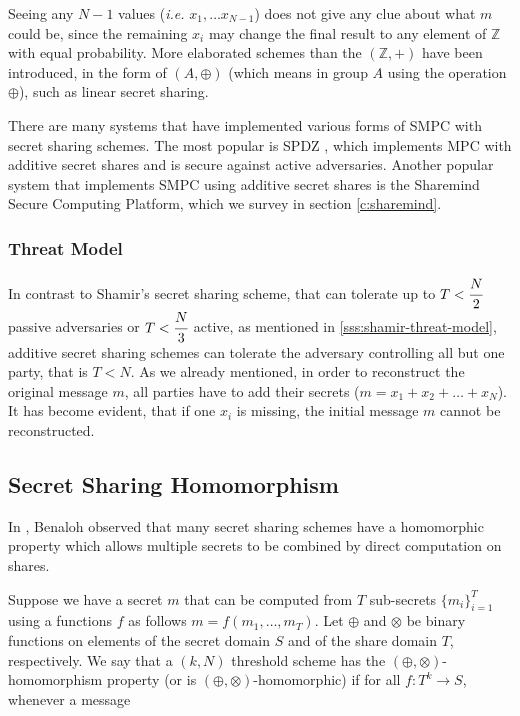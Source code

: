 Seeing any $N-1$ values (\textit{i.e.} $x_1, \dots x_{N-1}$) does not give any clue about what $m$ could be, since the remaining $x_i$ may change the final result to any element of $\mathbb{Z}$ with equal probability.
More elaborated schemes than the $(\mathbb{Z}, +)$ have been introduced, in the form of $(A, \oplus)$ (which means in group $A$ using the operation $\oplus$), such as linear secret sharing.

There are many systems that have implemented various forms of SMPC with secret sharing schemes.
The most popular is SPDZ \cite{damgaard2012multiparty}, which implements MPC with additive secret shares and is secure against active adversaries.
Another popular system that implements SMPC using additive secret shares is the Sharemind Secure Computing Platform, which we survey in section \ref{c:sharemind}.


\subsubsection{Threat Model}\label{sss:additive-threat-model}
In contrast to Shamir's secret sharing scheme, that can tolerate up to $T < \cfrac{N}{2}$ passive adversaries or $T < \cfrac{N}{3}$ active, as mentioned in \ref{sss:shamir-threat-model}, additive secret sharing schemes can tolerate the adversary controlling all but one party, that is $T < N$.
As we already mentioned, in order to reconstruct the original message $m$, all parties have to add their secrets ($m = x_1 + x_2 + \dots + x_N$).
It has become evident, that if one $x_i$ is missing, the initial message $m$ cannot be reconstructed.



\subsection{Secret Sharing Homomorphism}\label{ss:secret-sharing-homomorphism}
In \cite{benaloh1986secret}, Benaloh observed that many secret sharing schemes have a homomorphic property which allows multiple secrets to be combined by direct computation on shares.

Suppose we have a secret $m$ that can be computed from $T$ sub-secrets $\{m_i\}^T_{i=1}$ using a functions $f$ as follows $m = f(m_1, \dots, m_T)$.
Let $\oplus$ and $\otimes$ be binary functions on elements of the secret domain $S$ and of the share domain $T$, respectively.
We say that a $(k, N)$ threshold scheme has the $(\oplus, \otimes)$-homomorphism property (or is $(\oplus, \otimes)$-homomorphic) if for all $f: T^k \rightarrow S$, whenever a message

